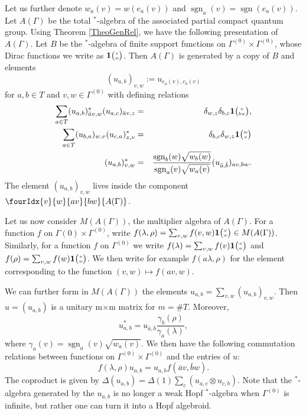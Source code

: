 \documentclass[11pt]{article}
\DeclareMathOperator{\sgn}{\mathrm{sgn}}
\newcommand{\Grt}[3]{#1{\tiny {\begin{pmatrix} #2\\#3\end{pmatrix}}}}
\newcommand{\UnitC}[2]{\Grt{\mathbf{1}}{#1}{#2}}
\newcommand{\Gr}[5]{\fourIdx{#2}{#4}{#3}{#5}{#1}}%
\theoremstyle{definition}
\numberwithin{equation}{section}
\begin{document}
Let us further denote $w_a(v) = w(e_a(v))$ and $\sgn_a(v) = \sgn(e_a(v))$. Let $A(\Gamma)$ be the total $^*$-algebra of the associated partial compact quantum group. Using Theorem \ref{TheoGenRel}, we have the following presentation of $A(\Gamma)$. Let $B$ be the $^*$-algebra of finite support functions on $\Gamma^{(0)}\times \Gamma^{(0)}$, whose Dirac functions we write as $\UnitC{v}{w}$. Then $A(\Gamma)$ is generated by a copy of $B$ and elements \[(u_{a,b})_{v,w} := u_{e_a(v),e_b(v)}\] for $a,b\in T$ and $v,w\in \Gamma^{(0)}$ with defining relations \begin{eqnarray*} \sum_{a\in T} (u_{a,b})_{\bar{a}v,w}^* (u_{a,c})_{\bar{a}v,z}&=& \delta_{w,z} \delta_{b,c} \UnitC{v}{bw},\\ \sum_{a\in T} (u_{b,a})_{w,v} (u_{c,a})_{z,v}^* &=& \delta_{b,c}\delta_{w,z} \UnitC{w}{v}\\ (u_{a,b})_{v,w}^* &=& \frac{\sgn_b(w)\sqrt{w_b(w)}}{\sgn_a(v)\sqrt{w_a(v)}}(u_{\bar{a},\bar{b}})_{av,bw}.\end{eqnarray*} The element $(u_{a,b})_{v,w}$ lives inside the component $\Gr{A(\Gamma)}{v}{av}{w}{bw}$.

Let us now consider $M(A(\Gamma))$, the multiplier algebra of $A(\Gamma)$. For a function $f$ on $\Gamma{(0)}\times \Gamma^{(0)}$, write $f(\lambda,\rho) = \sum_{v,w} f(v,w)\UnitC{v}{w} \in M(A(\Gamma))$. Similarly, for a function $f$ on $\Gamma^{(0)}$ we write $f(\lambda) = \sum_{v,w} f(v)\UnitC{v}{w}$ and $f(\rho) = \sum_{v,w}f(w)\UnitC{v}{w}$. We then write for example $f(a\lambda,\rho)$ for the element corresponding to the function $(v,w)\mapsto f(av,w)$.

We can further form in $M(A(\Gamma))$ the elements $u_{a,b} = \sum_{v,w} (u_{a,b})_{v,w}$. Then $u=(u_{a,b})$ is a unitary m$\times$m matrix for $m=\#T$. Moreover, \begin{equation}\label{EqAdju}u_{a,b}^* =  u_{\bar{a},\bar{b}}\frac{\gamma_b(\rho)}{\gamma_a(\lambda)},\end{equation} where $\gamma_a(v) = \sgn_a(v)\sqrt{w_a(v)}$.   We then have the following commutation relations between functions on $\Gamma^{(0)}\times \Gamma^{(0)}$ and the entries of $u$: \begin{equation}\label{EqGradu} f(\lambda,\rho)u_{a,b} = u_{a,b}f(\bar{a}v,\bar{b}w).\end{equation} The coproduct is given by $\Delta(u_{a,b}) = \Delta(1) \sum_c(u_{a,c}\otimes u_{c,b})$. Note that the $^*$-algebra generated by the $u_{a,b}$ is no longer a weak Hopf $^*$-algebra when $\Gamma^{(0)}$ is infinite, but rather one can turn it into a Hopf algebroid. %
\end{document}
